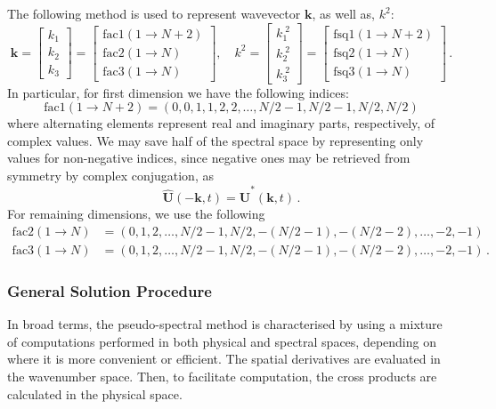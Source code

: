 \documentclass{pracamgren}
\begin{document}
The following method is used to represent wavevector $\mathbf{k}$, as well as, $k^2$:
$$
\mathbf{k} =
\begin{bmatrix}
k_1 \\ k_2 \\ k_3
\end{bmatrix}
=
\begin{bmatrix}
\text{fac1}(1 \rightarrow N + 2) \\ \text{fac2}(1 \rightarrow N) \\ \text{fac3}(1 \rightarrow N)
\end{bmatrix} ,
\quad
k^2 =
\begin{bmatrix}
k_1^{\; 2} \\ k_2^{\; 2} \\ k_3^{\; 2}
\end{bmatrix}
=
\begin{bmatrix}
\text{fsq1}(1 \rightarrow N + 2) \\ \text{fsq2}(1 \rightarrow N) \\ \text{fsq3}(1 \rightarrow N)
\end{bmatrix}
\, .
$$
In particular, for first dimension we have the following indices:
$$ \text{fac1}(1 \rightarrow N + 2) = (0, 0, 1, 1, 2, 2, \ldots, N/2 - 1, N/2 - 1, N/2, N/2)  $$
where alternating elements represent real and imaginary parts, respectively, of complex values.
We may save half of the spectral space by representing only values for non-negative indices, since negative ones may be retrieved from symmetry by complex conjugation, as
$$ \mathbf{\hat{U}}(- \mathbf{k}, t) = \mathbf{\hat{U}}^* (\mathbf{k}, t) \, . $$
For remaining dimensions, we use the following
\begin{align*}
\text{fac2}(1 \rightarrow N) &= (0, 1, 2, \ldots, N/2 - 1, N/2, -(N/2 -1), -(N/2 -2), \ldots, -2, -1) \\
\text{fac3}(1 \rightarrow N) &= (0, 1, 2, \ldots, N/2 - 1, N/2, -(N/2 -1), -(N/2 -2), \ldots, -2, -1) \, .
\end{align*}

\subsubsection{General Solution Procedure}

In broad terms, the pseudo-spectral method is characterised by using a mixture of computations performed in both physical and spectral spaces, depending on where it is more convenient or efficient. 
The spatial derivatives are evaluated in the wavenumber space.
Then, to facilitate computation, the cross products are calculated in the physical space.
\end{document}
